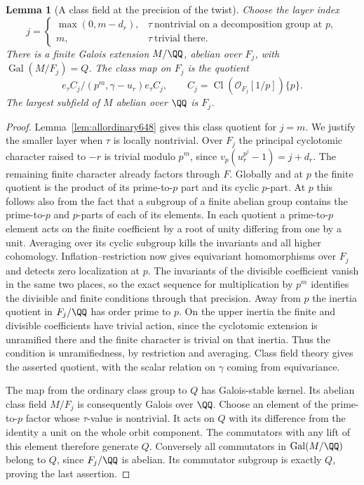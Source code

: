 \documentclass[a4paper,11pt]{article}
\newtheorem{lemma}[proposition]{Lemma}
\theoremstyle{definition}
\theoremstyle{remark}
\numberwithin{equation}{section}
\newcommand{\Cl}{\operatorname{Cl}}
\begin{document}
\begin{lemma}[A class field at the precision of the twist]
\leavevmode\label{lem:twistdepth652}
Choose the layer index
\[
 j=
 \begin{cases}
  \max(0,m-d_r),&\tau\ \text{nontrivial on a decomposition group at }p,\\
  m,&\tau\ \text{trivial there}.
 \end{cases}
\]
There is a finite Galois extension \(M/\QQ\), abelian over
\(F_j\), with \(\operatorname{Gal}(M/F_j)=Q\). The class
map on \(F_j\) is the quotient
\[
 e_\tau C_j/(p^m,\gamma-u_r)e_\tau C_j,\qquad
                C_j=\Cl(\mathcal O_{F_j}[1/p])\{p\}.
\]
The largest subfield of \(M\) abelian over \(\QQ\) is \(F_j\).
\end{lemma}
\begin{proof}
Lemma~\ref{lem:allordinary648} gives this class quotient for
\(j=m\). We justify the smaller layer when \(\tau\) is locally
nontrivial. Over \(F_j\) the principal cyclotomic character
raised to \(-r\) is trivial modulo \(p^m\), since
\(v_p(u_r^{p^j}-1)=j+d_r\). The remaining finite character
already factors through \(F\). Globally and at \(p\) the
finite quotient is the product of its prime-to-\(p\) part
and its cyclic \(p\)-part. At \(p\) this follows also from
the fact that a subgroup of a finite abelian group contains
the prime-to-\(p\) and \(p\)-parts of each of its elements.
In each quotient a prime-to-\(p\) element acts on the finite
coefficient by a root of unity differing from one by a unit.
Averaging over its cyclic subgroup kills the invariants and
all higher cohomology. Inflation--restriction now gives
equivariant homomorphisms over \(F_j\) and detects zero
localization at \(p\). The invariants of the divisible
coefficient vanish in the same two places, so the exact
sequence for multiplication by \(p^m\) identifies the
divisible and finite conditions through that precision.
Away from \(p\) the inertia quotient in \(F_j/\QQ\) has
order prime to \(p\). On the upper inertia the finite and
divisible coefficients have trivial action, since the
cyclotomic extension is unramified there and the finite
character is trivial on that inertia. Thus the condition
is unramifiedness, by restriction and averaging. Class
field theory gives the asserted quotient, with the scalar
relation on \(\gamma\) coming from equivariance.

The map from the ordinary class group to \(Q\) has
Galois-stable kernel. Its abelian class field \(M/F_j\)
is consequently Galois over \(\QQ\). Choose an element of
the prime-to-\(p\) factor whose \(\tau\)-value is nontrivial.
It acts on \(Q\) with its difference from the identity a
unit on the whole orbit component. The commutators with
any lift of this element therefore generate \(Q\).
Conversely all commutators in \(\operatorname{Gal}(M/\QQ)\)
belong to \(Q\), since \(F_j/\QQ\) is abelian. Its
commutator subgroup is exactly \(Q\), proving the last assertion.
\end{proof}
\end{document}

